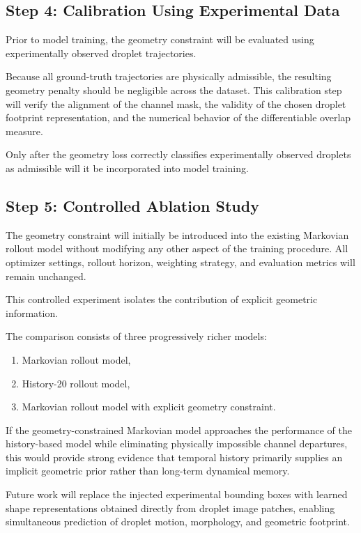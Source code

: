 \documentclass[11pt]{article}
\begin{document}
\subsection{Step 4: Calibration Using Experimental Data}

Prior to model training, the geometry constraint will be evaluated using experimentally observed droplet trajectories.

Because all ground-truth trajectories are physically admissible, the resulting geometry penalty should be negligible across the dataset. This calibration step will verify the alignment of the channel mask, the validity of the chosen droplet footprint representation, and the numerical behavior of the differentiable overlap measure.

Only after the geometry loss correctly classifies experimentally observed droplets as admissible will it be incorporated into model training.

\subsection{Step 5: Controlled Ablation Study}

The geometry constraint will initially be introduced into the existing Markovian rollout model without modifying any other aspect of the training procedure. All optimizer settings, rollout horizon, weighting strategy, and evaluation metrics will remain unchanged.

This controlled experiment isolates the contribution of explicit geometric information.

The comparison consists of three progressively richer models:

\begin{enumerate}
\item Markovian rollout model,
\item History-20 rollout model,
\item Markovian rollout model with explicit geometry constraint.
\end{enumerate}

If the geometry-constrained Markovian model approaches the performance of the history-based model while eliminating physically impossible channel departures, this would provide strong evidence that temporal history primarily supplies an implicit geometric prior rather than long-term dynamical memory.

Future work will replace the injected experimental bounding boxes with learned shape representations obtained directly from droplet image patches, enabling simultaneous prediction of droplet motion, morphology, and geometric footprint.
\end{document}
